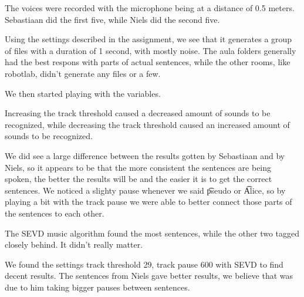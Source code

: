 
The voices were recorded with the microphone being at a distance of 0.5 meters. Sebastiaan did the first five, while Niels did the second five.

Using the settings described in the assignment, we see that it generates a group of files with a duration of 1 second, with mostly noise. The aula folders generally had the best respons with parts of actual sentences, while the other rooms, like robotlab, didn't generate any files or a few.

We then started playing with the variables.

Increasing the track threshold caused a decreased amount of sounds to be recognized, while decreasing the track threshold caused an increased amount of sounds to be recognized. 

We did see a large difference between the results gotten by Sebastiaan and by Niels, so it appears to be that the more consistent the sentences are being spoken, the better the results will be and the easier it is to get the correct sentences. We noticed a slighty pause whenever we said \t{pseudo} or \t{Alice}, so by playing a bit with the track pause we were able to better connect those parts of the sentences to each other.

The SEVD music algorithm found the most sentences, while the other two tagged closely behind. It didn't really matter.

We found the settings track threshold 29, track pause 600 with SEVD to find decent results. The sentences from Niels gave better results, we believe that was due to him taking bigger pauses between sentences.